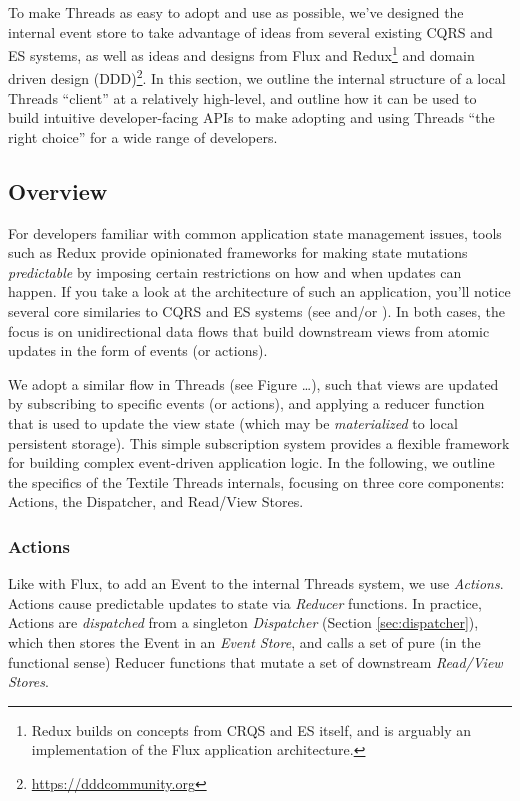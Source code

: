 \documentclass{textile}
\begin{document}
To make Threads as easy to adopt and use as possible, we've designed the internal event store to take advantage of ideas from several existing CQRS and ES systems, as well as ideas and designs from Flux \cite{facebookFluxInDepthOverview2019} and Redux\footnote{Redux builds on concepts from CRQS and ES itself, and is arguably an implementation of the Flux application architecture.} \cite{reduxMotivation} and domain driven design \cite{evansDomaindrivenDesignTackling2004a} (DDD)\footnote{\url{https://dddcommunity.org}}. In this section, we outline the internal structure of a local Threads ``client'' at a relatively high-level, and outline how it can be used to build intuitive developer-facing APIs to make adopting and using Threads ``the right choice'' for a wide range of developers.

\subsection{Overview}

For developers familiar with common application state management issues, tools such as Redux provide opinionated frameworks for making state mutations \emph{predictable} by imposing certain restrictions on how and when updates can happen. If you take a look at the architecture of such an application, you'll notice several core similaries to CQRS and ES systems (see \cite{facebookFluxInDepthOverview2019} and/or \cite{abramovCaseFlux2015}). In both cases, the focus is on unidirectional data flows that build downstream views from atomic updates in the form of events (or actions).

We adopt a similar flow in Threads (see Figure \dots), such that views are updated by subscribing to specific events (or actions), and applying a reducer function that is used to update the view state (which may be \emph{materialized} to local persistent storage). This simple subscription system provides a flexible framework for building complex event-driven application logic. In the following, we outline the specifics of the Textile Threads internals, focusing on three core components: Actions, the Dispatcher, and Read/View Stores.

\subsubsection{Actions}\label{sec:actions}

Like with Flux, to add an Event to the internal Threads system, we use \emph{Actions}. Actions cause predictable updates to state via \emph{Reducer} functions. In practice, Actions are \emph{dispatched} from a singleton \emph{Dispatcher} (Section \ref{sec:dispatcher}), which then stores the Event in an \emph{Event Store}, and calls a set of pure (in the functional sense) Reducer functions that mutate a set of downstream \emph{Read/View Stores}.
\end{document}
